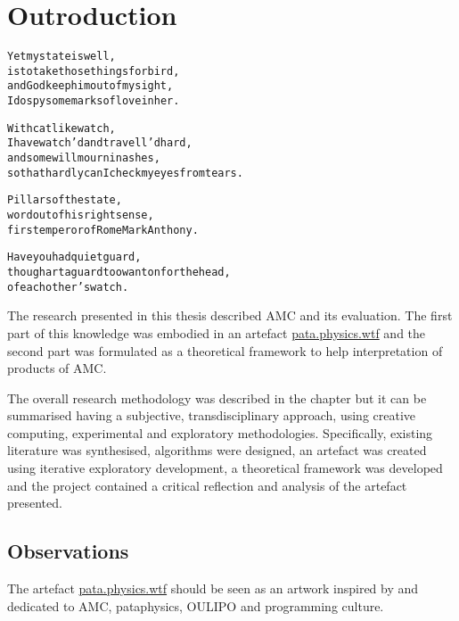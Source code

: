 
\chapter{Outroduction}
\label{ch:observations}

\startcontents[chapters]

\vfill

\begin{alltt}\sffamily
Yet my state is well,
is to take those things for bird,
and God keep him out of my sight,
I do spy some marks of love in her.

With catlike watch,
I have watch'd and travell'd hard,
and some will mourn in ashes,
so that hardly can I check my eyes from tears.

Pillars of the state,
word out of his right sense,
first emperor of Rome Mark Anthony.

Have you had quiet guard,
though art a guard too wanton for the head,
of each other's watch.
\end{alltt}

\newpage
\minicontents
\spirals


The research presented in this thesis described \acf{AMC} and its evaluation. The first part of this knowledge was embodied in an artefact \url{pata.physics.wtf} and the second part was formulated as a theoretical framework to help interpretation of products of \ac{AMC}.

The overall research methodology was described in the  chapter but it can be summarised having a subjective, transdisciplinary approach, using creative computing, experimental and exploratory methodologies. Specifically, existing literature was synthesised\sidepar{\textspiral~\ref{p:lit}}, algorithms were designed, an artefact was created using iterative exploratory development\sidepar{\textspiral~\ref{p:practice}}, a theoretical framework was developed \sidepar{\textspiral~\ref{p:theory}} and the project contained a critical reflection and analysis of the artefact presented\sidepar{\textspiral~\ref{p:analysis}}. 


\section{Observations}

The artefact \url{pata.physics.wtf} should be seen as an artwork inspired by and dedicated to \ac{AMC}, pataphysics, \ac{OULIPO} and programming culture.

